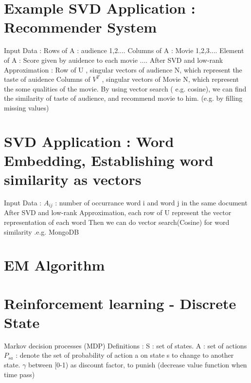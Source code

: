 \documentclass{article}
\begin{document}
\section{Example SVD Application : Recommender System}
Input Data : \newline
Rows of A : audience 1,2.... \newline
Columns of A : Movie 1,2,3.... \newline
Element of A : Score given by auidence to each movie .... \newline
After SVD and low-rank Approximation : \newline
Row of U , singular vectors of audience N, which represent the taste of auidence \newline
Columns of \(V^T\)   , singular vectors of Movie N,  which represent the some qualities of the movie. \newline
By using vector search ( e.g. cosine), we can find the similarity of taste of audience, and recommend movie to him. (e.g. by filling missing values)
\section{SVD Application : Word Embedding, Establishing word similarity as vectors}
Input Data : \newline
\(A_{ij}\) : number of occurrance word i and word j in the same document  \newline
After SVD and low-rank Approximation, each row of U represent the vector representation of each word \newline
Then we can do vector search(Cosine) for word similarity .e.g. MongoDB \newline
\section{EM Algorithm}

\section{Reinforcement learning - Discrete State}
Markov decision processes (MDP) \newline
Definitions :  \newline
S : set of states. \newline 
A : set of  actions \newline 
\(P_{sa}\) : denote the set of  probability of action a on state s to change to another state. \newline
\(\gamma\) between [0-1) as discount factor, to punish (decrease value function when time pass) \newline
\end{document}
